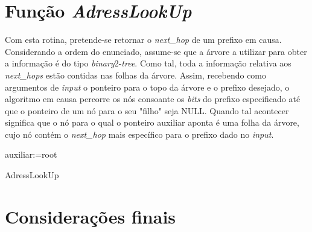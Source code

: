 \documentclass[a4paper]{article}
\begin{document}
\section{Função \textit{AdressLookUp}}
Com esta rotina, pretende-se retornar o \textit{next\_hop} de um prefixo em causa. Considerando a ordem do enunciado, assume-se que a árvore a utilizar para obter a informação é do tipo \textit{binary}2-\textit{tree}. Como tal, toda a informação relativa aos \textit{next\_hops} estão contidas nas folhas da árvore. Assim, recebendo como argumentos de \textit{input} o ponteiro para o topo da árvore e o prefixo desejado, o algoritmo em causa percorre os nós consoante os \textit{bits} do prefixo especificado até que o ponteiro de um nó para o seu "filho" seja NULL. Quando tal acontecer significa que o nó para o qual o ponteiro auxiliar aponta é uma folha da árvore, cujo nó contém o \textit{next\_hop} mais específico para o prefixo dado no \textit{input}.

\begin{algorithm}[H]
 auxiliar:=root\;
 
 \;
 \caption{AdressLookUp}
\end{algorithm}
\section{Considerações finais}
\end{document}
